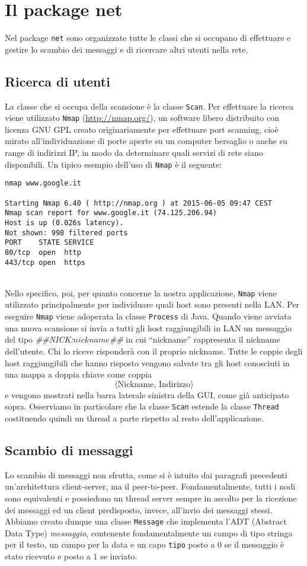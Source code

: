 \section{Il package net}
Nel package \texttt{net} sono organizzate tutte le classi che si occupano di effettuare e gestire lo
scambio dei messaggi e di ricercare altri utenti nella rete.

\subsection{Ricerca di utenti}
La classe che si occupa della scansione è la classe \texttt{Scan}. Per effettuare la
ricerca viene utilizzato \texttt{Nmap} (\url{http://nmap.org/}),  un software libero distribuito
con licenza GNU GPL creato originariamente per effettuare port scanning, cioè mirato
all'individuazione di porte aperte su un computer bersaglio o anche su range di indirizzi IP,
in modo da determinare quali servizi di rete siano disponibili. Un tipico esempio dell'uso
di \texttt{Nmap} è il seguente:

\begin{lstlisting}
nmap www.google.it

Starting Nmap 6.40 ( http://nmap.org ) at 2015-06-05 09:47 CEST
Nmap scan report for www.google.it (74.125.206.94)
Host is up (0.026s latency).
Not shown: 998 filtered ports
PORT    STATE SERVICE
80/tcp  open  http
443/tcp open  https
\end{lstlisting}
\leavevmode
\\
Nello specifico, poi, per quanto concerne la nostra applicazione, \texttt{Nmap}
viene utilizzato principalmente per individuare quali host sono presenti nella LAN.
Per eseguire \texttt{Nmap} viene adoperata la classe \texttt{Process} di Java.
Quando viene avviata una nuova scansione si invia a tutti gli host raggiungibili in LAN
un messaggio del tipo \emph{\#\#NICK:$nickname$\#\#} in cui ``nickname'' rappresenta il nickname
dell'utente. Chi lo riceve risponderà con il proprio nickname. Tutte le coppie degli 
host raggiungibili che hanno risposto vengono salvate tra gli host conosciuti in una mappa
a doppia chiave come coppia 
$$ \langle \text{Nickname, Indirizzo} \rangle $$
e vengono mostrati nella barra laterale sinistra della GUI, come già anticipato sopra.
Osserviamo in particolare che la classe \texttt{Scan}
estende la classe \texttt{Thread} costituendo quindi un thread a parte rispetto al resto
dell'applicazione.

\subsection{Scambio di messaggi}
Lo scambio di messaggi non sfrutta, come si è intuito dai paragrafi precedenti un'architettura
client-server, ma il peer-to-peer. Fondamentalmente, tutti i nodi sono equivalenti e possiedono
un thread server sempre in ascolto per la ricezione dei messaggi ed un client predisposto, invece, all'invio
dei messaggi stessi. Abbiamo creato dunque una classe \texttt{Message} che implementa l'ADT (Abstract Data Type)
\textit{messaggio}, contenente fondamentalmente un campo di tipo stringa per il testo, un campo
per la data e un capo \texttt{tipo} posto a $0$ se il messaggio è stato ricevuto e posto a $1$ se inviato.

